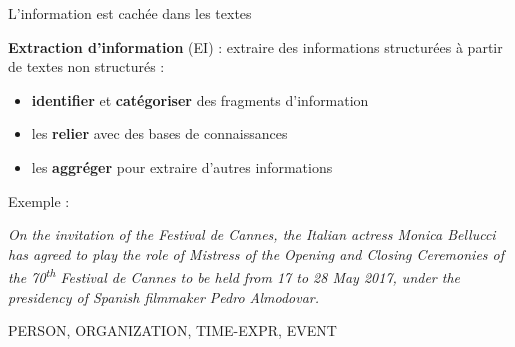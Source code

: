 \documentclass[xetex,xcolor={table,usenames,dvipsnames}]{beamer}
\newcommand{\bolder}[1]{{\color{purple}\bfseries#1}}
\begin{document}
\begin{frame}{L'information est \og{}cachée\fg{} dans les textes}
	
		\textbf{Extraction d'information} (\textsc{EI}) : extraire des informations structurées à partir de textes non structurés : 
	\begin{itemize}
		\item \bolder{identifier} et \bolder{catégoriser} des fragments d'information
		\item les \bolder{relier} avec des bases de connaissances
		\item les \bolder{aggréger} pour extraire d'autres informations
	\end{itemize}
	
	Exemple : 
	
	{ \footnotesize
	\textit{On the invitation of the \colorbox{Red!30}{Festival de Cannes}, the Italian actress \colorbox{Cerulean!30}{Monica Bellucci} has agreed to play the role of Mistress of the Opening and Closing Ceremonies of the \colorbox{OliveGreen!30}{70\textsuperscript{th} Festival de Cannes} to be held \colorbox{RubineRed!30}{from 17 to 28 May 2017}, under the presidency of Spanish filmmaker \colorbox{Cerulean!30}{Pedro Almodovar}.}
	
	\medskip
	\textcolor{Cerulean}{PERSON}, \textcolor{Red!50}{ORGANIZATION}, \textcolor{RubineRed}{TIME-EXPR}, \textcolor{OliveGreen}{EVENT}
}
	

\end{frame}
\end{document}
